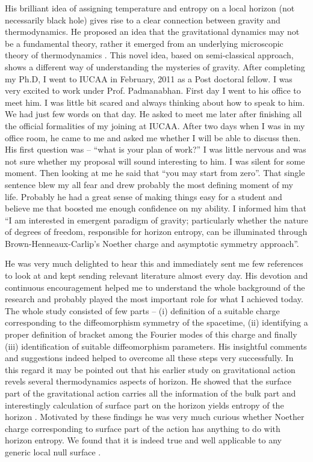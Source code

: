 \documentclass[prd, preprint, longbibliography, 11pt]{revtex4-1}
\begin{document}
His brilliant idea of assigning temperature and entropy on a local horizon (not necessarily black hole) gives rise to a clear connection between gravity and thermodynamics. He proposed an idea that the gravitational dynamics may not be a fundamental theory, rather it  emerged from an underlying microscopic theory of thermodynamics \cite{Padmanabhan:2014jta}. This novel idea, based on semi-classical approach, shows a different way of understanding the mysteries of gravity. After completing my Ph.D, I went to IUCAA in February, 2011 as a Post doctoral fellow. I was very excited to work under Prof. Padmanabhan. First day I went to his office to meet him. I was little bit scared and always thinking about how to speak to him. We had just few words on that day. He asked to meet me later after finishing all the official formalities of my joining at IUCAA. After two days when I was in my office room, he came to me and asked me whether I will be able to discuss then. His first question was --  ``what is your plan of work?'' I was little nervous and was not sure whether my proposal will sound interesting to him. I was silent for some moment. Then looking at me he said that ``you may start from zero''.  That single sentence blew my all fear and drew probably the most defining moment of my life. Probably he had a great sense of making things easy for a student and believe me that  boosted me enough confidence on my ability. I informed him that ``I am interested in emergent paradigm of gravity; particularly whether the nature of degrees of freedom, responsible for horizon entropy, can be illuminated through Brown-Henneaux-Carlip's \cite{Brown:1986nw,Carlip:1998wz} Noether charge and asymptotic symmetry approach''.  

He was very much delighted to hear this and immediately sent me few references to look at and kept sending relevant literature almost every day. His devotion and continuous encouragement helped me to understand the whole background of the research and probably played the most important role for what I achieved today. The whole study  consisted of few parts -- (i) definition of a suitable charge corresponding to the diffeomorphism symmetry of the spacetime, (ii) identifying a proper definition of bracket among the Fourier modes of this charge and finally (iii) identification of suitable diffeomorphism parameters. His insightful comments and suggestions indeed helped to overcome all these steps very successfully. In this regard it may be pointed out that his earlier study \cite{Padmanabhan:2009vy} on gravitational action revels several thermodynamics aspects of horizon. He showed that the surface part of the gravitational action carries all the information of the bulk part and interestingly calculation of surface part on the horizon yields entropy of the horizon \cite{Padmanabhan:2009vy}. Motivated by these findings he was very much curious whether Noether charge corresponding to surface part of the action has anything to do with horizon entropy. We found that it is indeed 
true and well applicable to any generic local null surface \cite{Majhi:2012tf,Bhattacharya:2018epn}. 
\end{document}
